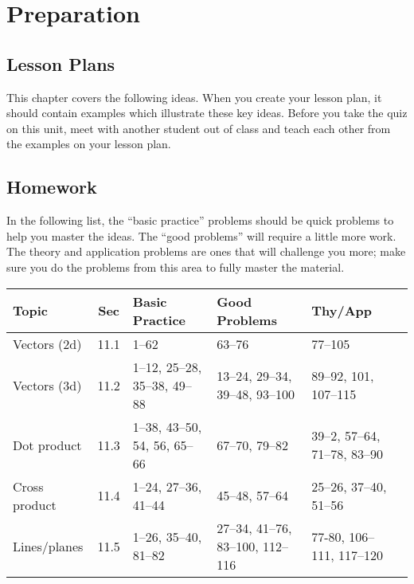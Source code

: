 \section{Preparation}

\subsection{Lesson Plans}

This chapter covers the following ideas. When you create your lesson plan, it should contain examples which illustrate these key ideas. Before you take the quiz on this unit, meet with another student out of class and teach each other from the examples on your lesson plan. 






\subsection{Homework}

In the following list, the ``basic practice'' problems should be quick
problems to help you master the ideas.  The ``good problems'' will
require a little more work.  The theory and application problems are
ones that will challenge you more; make sure you do the problems from
this area to fully master the material.  

\medskip
{\noindent \footnotesize 
\begin{tabular}{|l|c|l|l|l|l|}\hline
Topic &Sec &Basic Practice &Good Problems &Thy/App \\\hline
Vectors (2d) & 11.1 & 1--62 & 63--76 & 77--105\\\hline
Vectors (3d) & 11.2 & 1--12, 25--28, 35--38, 49--88 & 13--24, 29--34, 39--48, 93--100 & 89--92, 101, 107--115\\\hline
Dot product & 11.3 & 1--38, 43--50, 54, 56, 65--66 & 67--70, 79--82 & 39--2, 57--64, 71--78, 83--90\\\hline
Cross product & 11.4 & 1--24, 27--36, 41--44 & 45--48, 57--64 & 25--26, 37--40, 51--56\\\hline
Lines/planes & 11.5 & 1--26, 35--40, 81--82 & 27--34, 41--76, 83--100, 112--116 & 77-80, 106--111, 117--120\\\hline
\end{tabular}
\smallskip
}



